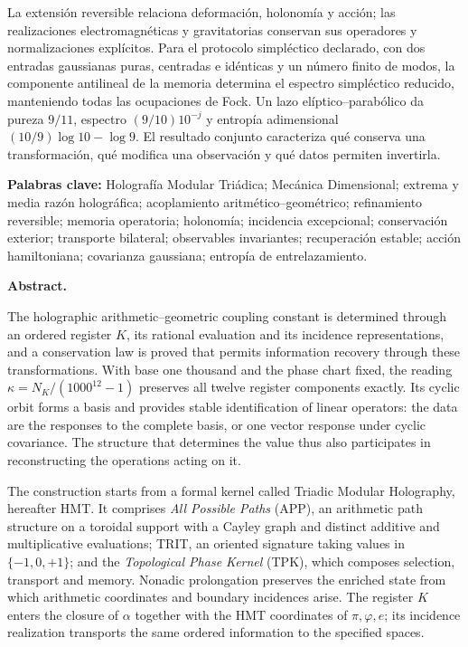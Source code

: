 La extensión reversible relaciona deformación, holonomía y acción; las realizaciones electromagnéticas y gravitatorias conservan sus operadores y normalizaciones explícitos. Para el protocolo simpléctico declarado, con dos entradas gaussianas puras, centradas e idénticas y un número finito de modos, la componente antilineal de la memoria determina el espectro simpléctico reducido, manteniendo todas las ocupaciones de Fock. Un lazo elíptico--parabólico da pureza \(9/11\), espectro \((9/10)10^{-j}\) y entropía adimensional \((10/9)\log10-\log9\). El resultado conjunto caracteriza qué conserva una transformación, qué modifica una observación y qué datos permiten invertirla.

\medskip
\noindent\textbf{Palabras clave:} Holografía Modular Triádica; Mecánica Dimensional; extrema y media razón holográfica; acoplamiento aritmético--geométrico; refinamiento reversible; memoria operatoria; holonomía; incidencia excepcional; conservación exterior; transporte bilateral; observables invariantes; recuperación estable; acción hamiltoniana; covarianza gaussiana; entropía de entrelazamiento.

\clearpage
\noindent\textbf{Abstract.}\par\smallskip
The holographic arithmetic--geometric coupling constant is determined through an ordered register \(K\), its rational evaluation and its incidence representations, and a conservation law is proved that permits information recovery through these transformations. With base one thousand and the phase chart fixed, the reading \(\kappa=N_K/(1000^{12}-1)\) preserves all twelve register components exactly. Its cyclic orbit forms a basis and provides stable identification of linear operators: the data are the responses to the complete basis, or one vector response under cyclic covariance. The structure that determines the value thus also participates in reconstructing the operations acting on it.

The construction starts from a formal kernel called Triadic Modular Holography, hereafter HMT. It comprises \emph{All Possible Paths} (APP), an arithmetic path structure on a toroidal support with a Cayley graph and distinct additive and multiplicative evaluations; TRIT, an oriented signature taking values in \(\{-1,0,+1\}\); and the \emph{Topological Phase Kernel} (TPK), which composes selection, transport and memory. Nonadic prolongation preserves the enriched state from which arithmetic coordinates and boundary incidences arise. The register \(K\) enters the closure of \(\alpha\) together with the HMT coordinates of \(\pi,\varphi,e\); its incidence realization transports the same ordered information to the specified spaces.

